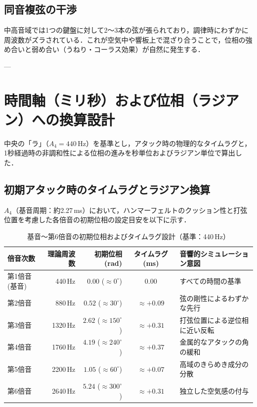 \documentclass[uplatex,dvipdfmx]{jlreq}
\begin{document}
\subsection{同音複弦の干渉}
中高音域では1つの鍵盤に対して2〜3本の弦が張られており，調律時にわずかに周波数がズラされている．これが空気中や響板上で混ざり合うことで，位相の強め合いと弱め合い（うねり・コーラス効果）が自然に発生する．

---

\section{時間軸（ミリ秒）および位相（ラジアン）への換算設計}
中央の「ラ」（$A_4 = 440\,\text{Hz}$）を基準とし，アタック時の物理的なタイムラグと，1秒経過時の非調和性による位相の進みを秒単位およびラジアン単位で算出した．

\subsection{初期アタック時のタイムラグとラジアン換算}
$A_4$（基音周期：約2.27\,ms）において，ハンマーフェルトのクッション性と打弦位置を考慮した各倍音の初期位相の設定目安を以下に示す．

\begin{table}[h]
\centering
\caption{基音〜第6倍音の初期位相およびタイムラグ設計（基準：440\,Hz）}
\begin{tabular}{lrrcl}
\toprule
倍音次数 & 理論周波数 & 初期位相 (rad) & タイムラグ (ms) & 音響的シミュレーション意図 \\
\midrule
第1倍音 (基音) & 440\,Hz  & $0.00$ ($\approx 0^\circ$)   & $0.00$ & すべての時間の基準 \\
第2倍音        & 880\,Hz  & $0.52$ ($\approx 30^\circ$)  & $\approx +0.09$ & 弦の剛性によるわずかな先行 \\
第3倍音        & 1320\,Hz & $2.62$ ($\approx 150^\circ$) & $\approx +0.31$ & 打弦位置による逆位相に近い反転 \\
第4倍音        & 1760\,Hz & $4.19$ ($\approx 240^\circ$) & $\approx +0.37$ & 金属的なアタックの角の緩和 \\
第5倍音        & 2200\,Hz & $1.05$ ($\approx 60^\circ$)  & $\approx +0.07$ & 高域のきらめき成分の分散 \\
第6倍音        & 2640\,Hz & $5.24$ ($\approx 300^\circ$) & $\approx +0.31$ & 独立した空気感の付与 \\
\bottomrule
\end{tabular}
\end{table}
\end{document}
